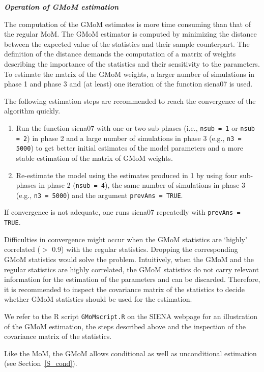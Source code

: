 \documentclass[a4paper,fleqn,11pt]{article}
\newcommand{\+}{\, + \,}
\newcommand{\R}{{\sf R }}
\newcommand{\SI}{{\sf SIENA }}
\begin{document}
\noindent
\textbf{\emph{Operation of GMoM estimation }}
\medskip

The computation of the GMoM estimates is more time consuming than that of the regular MoM.
The GMoM estimator is computed by minimizing the distance between the
expected value of the statistics and their sample counterpart.
The definition of the distance demands the computation of a matrix of weights
describing the importance of the statistics and their sensitivity
to the parameters. To estimate the matrix of the GMoM weights, a larger number of simulations
in phase 1 and phase 3 and (at least) one iteration of the function \textsf{siena07} is used.

The following estimation steps are recommended to reach the convergence of the algorithm quickly.
\begin{enumerate}
	\item  Run the function \textsf{siena07} with one or two sub-phases (i.e.,
\texttt{nsub = 1} or \texttt{nsub = 2}) in phase 2 and a large number of simulations in phase 3
(e.g., \texttt{n3 = 5000}) to get better initial estimates of the model parameters and a
more stable estimation of the matrix of GMoM weights.
 \item Re-estimate the model using the estimates produced in 1 by using four sub-phases in phase 2
(\texttt{nsub = 4}), the same number of simulations in phase 3 (e.g., \texttt{n3 = 5000}) and the
argument \texttt{prevAns = TRUE}.
\end{enumerate}
If convergence is not adequate, one runs \textsf{siena07} repeatedly with \texttt{prevAns = TRUE}.

Difficulties in convergence might occur when the GMoM statistics are `highly' correlated ($>$ 0.9) with the regular statistics. Dropping the corresponding GMoM statistics would solve the problem. Intuitively, when the GMoM and the regular statistics are highly correlated, the GMoM statistics do not carry relevant information
for the estimation of the parameters and can be discarded. Therefore, it is recommended to inspect the covariance matrix of the statistics to decide whether GMoM statistics should be used for the estimation.

We refer to  the  \R script \texttt{GMoMscript.R} on the \SI webpage for an illustration of the GMoM estimation, the steps described above and the inspection of the covariance matrix of the statistics.

Like the MoM, the GMoM allows conditional as well as unconditional estimation (see Section~\ref{S_cond}).
\end{document}
